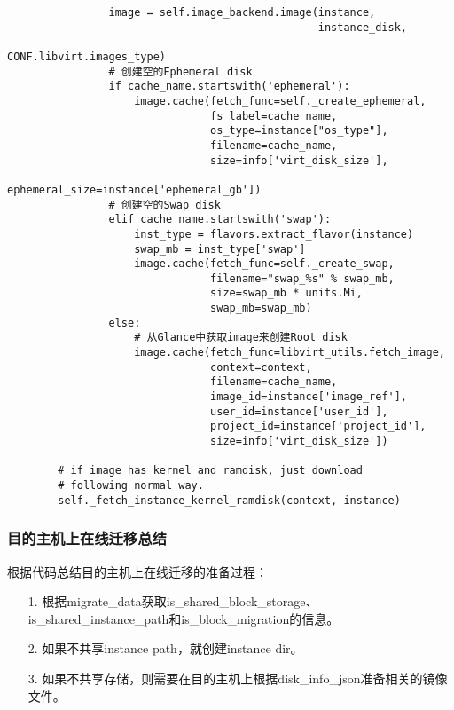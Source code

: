 \documentclass[a4paper,left=1.5cm,right=1.5cm,11pt]{article}
\begin{document}
\begin{lstlisting}
                image = self.image_backend.image(instance,
                                                 instance_disk,
                                                 CONF.libvirt.images_type)
				# 创建空的Ephemeral disk
                if cache_name.startswith('ephemeral'):
                    image.cache(fetch_func=self._create_ephemeral,
                                fs_label=cache_name,
                                os_type=instance["os_type"],
                                filename=cache_name,
                                size=info['virt_disk_size'],
                                ephemeral_size=instance['ephemeral_gb'])
				# 创建空的Swap disk
                elif cache_name.startswith('swap'):
                    inst_type = flavors.extract_flavor(instance)
                    swap_mb = inst_type['swap']
                    image.cache(fetch_func=self._create_swap,
                                filename="swap_%s" % swap_mb,
                                size=swap_mb * units.Mi,
                                swap_mb=swap_mb)
                else:
					# 从Glance中获取image来创建Root disk
                    image.cache(fetch_func=libvirt_utils.fetch_image,
                                context=context,
                                filename=cache_name,
                                image_id=instance['image_ref'],
                                user_id=instance['user_id'],
                                project_id=instance['project_id'],
                                size=info['virt_disk_size'])

        # if image has kernel and ramdisk, just download
        # following normal way.
        self._fetch_instance_kernel_ramdisk(context, instance)
	\end{lstlisting}

\subsubsection{目的主机上在线迁移总结}
	根据代码总结目的主机上在线迁移的准备过程：
	\begin{itemize}
		\item[1.] 根据migrate\_data获取is\_shared\_block\_storage、is\_shared\_instance\_path和is\_block\_migration的信息。
		\item[2.] 如果不共享instance path，就创建instance dir。
		\item[3.] 如果不共享存储，则需要在目的主机上根据disk\_info\_json准备相关的镜像文件。
	\end{itemize}
\end{document}
